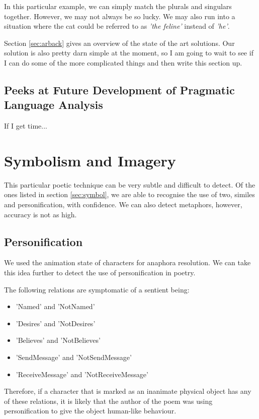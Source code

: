 In this particular example, we can simply match the plurals and singulars together. However, we may not always be so lucky. We may also run into a situation where the cat could be referred to as \textit{'the feline'} instead of \textit{'he'}.

Section \ref{sec:arback} gives an overview of the state of the art solutions. Our solution is also pretty darn simple at the moment, so I am going to wait to see if I can do some of the more complicated things and then write this section up.


\subsection{Peeks at Future Development of Pragmatic Language Analysis}

If I get time...


\section{Symbolism and Imagery}

This particular poetic technique can be very subtle and difficult to detect. Of the ones listed in section \ref{sec:symbol}, we are able to recognise the use of two, similes and personification, with confidence. We can also detect metaphors, however, accuracy is not as high.

\subsection{Personification}

We used the animation state of characters for anaphora resolution. We can take this idea further to detect the use of personification in poetry.

The following relations are symptomatic of a sentient being:

\begin{itemize}
\item{'Named' and 'NotNamed'}
\item{'Desires' and 'NotDesires'}
\item{'Believes' and 'NotBelieves'}
\item{'SendMessage' and 'NotSendMessage'}
\item{'ReceiveMessage' and 'NotReceiveMessage'}
\end{itemize}

Therefore, if a character that is marked as an inanimate physical object has any of these relations, it is likely that the author of the poem was using personification to give the object human-like behaviour.


